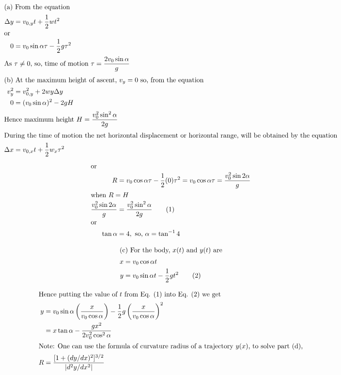 \begin{solution}
    \begin{center}
    \end{center}
    
    \begin{align*}
        \intertext{(a) From the equation}
        \Delta y &= v_{0,y}t + \dfrac{1}{2}wt^2\\
        \intertext{or}
        0 &= v_0 \sin \alpha \tau - \dfrac{1}{2} g \tau^2\\
        \intertext{As $\tau \neq 0$, so, time of motion $\tau = \dfrac{2v_0 \sin \alpha}{g}$}
        \intertext{(b) At the maximum height of ascent, $v_y = 0$ so, from the equation}
        v^2_y &= v^2_{0,y} + 2wy \Delta y\\
        0 &= (v_0 \sin \alpha)^2 - 2gH\\
        \intertext{Hence maximum height $H = \dfrac{v_0^2 \sin^2 \alpha}{2g}$}
        \intertext{During the time of motion the net horizontal displacement or horizontal range, will be obtained by the equation}
        \Delta x &= v_{0,x}t + \dfrac{1}{2} w_x \tau^2
    \end{align*}
    
    \begin{align*}
        \intertext{or}
        R &= v_0 \cos \alpha \tau - \dfrac{1}{2} (0) \tau^2 = v_0 \cos \alpha \tau = \dfrac{v_0^2 \sin 2 \alpha}{g}\\
        \intertext{when $R = H$}
        \dfrac{v_0^2 \sin 2 \alpha}{g} &= \dfrac{v_0^2 \sin^2 \alpha}{2g} \tag{1}\\
        \intertext{or}
        \tan \alpha &= 4, \text{ so, } \alpha = \tan^{-1} 4
    \end{align*}
    
    \begin{align*}
        \intertext{(c) For the body, \( x(t) \) and \( y(t) \) are}
        x &= v_0 \cos \alpha t\\
        y &= v_0 \sin \alpha t - \dfrac{1}{2} gt^2 \tag{2}
    \end{align*}
    
    \begin{align*}
        \intertext{Hence putting the value of $t$ from Eq. (1) into Eq. (2) we get}
        y &= v_0 \sin \alpha \left( \dfrac{x}{v_0 \cos \alpha} \right) - \dfrac{1}{2} g \left( \dfrac{x}{v_0 \cos \alpha} \right)^2\\
        &= x \tan \alpha - \dfrac{gx^2}{2 v_0^2 \cos^2 \alpha}\\
        \intertext{Note: One can use the formula of curvature radius of a trajectory $y (x)$, to solve part (d),}
        R &= \dfrac{[1 + (dy/dx)^2]^{3/2}}{|d^2y/dx^2|}
    \end{align*}
\end{solution}
